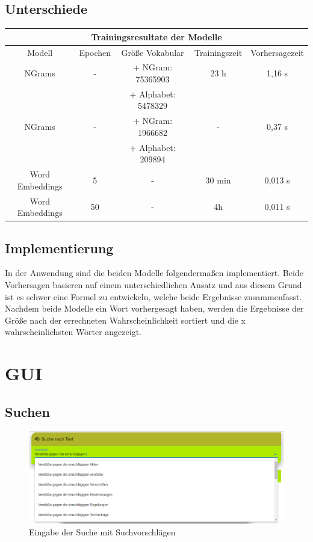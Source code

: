 \section{Unterschiede}
\begin{center}
	\begin{tabular}{|c c c c c|} 
		\hline
		\multicolumn{5}{|c|}{Trainingsresultate der Modelle} \\ [1ex] 
		\hline
		Modell & Epochen & Größe Vokabular & Trainingszeit & Vorhersagezeit \\ [0.5ex] 
		
		\hline
		NGrams & - &	+ NGram: 75365903 &  23 h & 1,16 s \\
		& &	+ Alphabet:  5478329&  & \\
		
		\hline
		NGrams &  - &	+ NGram:  1966682&  - & 0,37 s \\
		& &	+ Alphabet:  209894&  & \\
		
		\hline
		Word Embeddings & 5 & - & 30 min &  0,013 s \\
		
		\hline
		Word Embeddings & 50 & - & 4h &   0,011 s\\
		
		\hline
	\end{tabular}
\end{center}

\section{Implementierung}
In der Anwendung sind die beiden Modelle folgendermaßen implementiert. Beide Vorhersagen basieren auf einem unterschiedlichen Ansatz und aus diesem Grund ist es schwer eine Formel zu entwickeln, welche beide Ergebnisse zusammenfasst. Nachdem beide Modelle ein Wort vorhergesagt haben, werden die Ergebnisse der Größe nach der errechneten Wahrscheinlichkeit sortiert und die x wahrscheinlichsten Wörter angezeigt. 

\chapter{GUI}

\section{Suchen}
\begin{figure}[H]
 \centering
 \includegraphics[width=\textwidth]{images/SucheScreenshot.png}
 \caption{Eingabe der Suche mit Suchvorschlägen}
 \label{fig:SucheScreenshot}
\end{figure}

